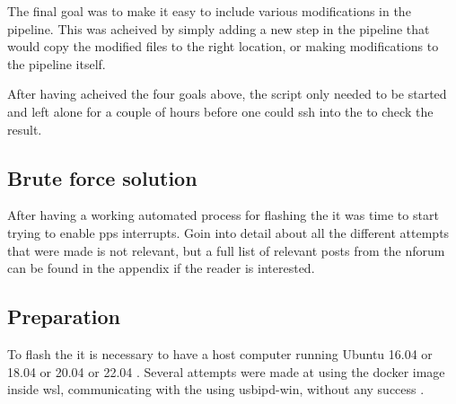 The final goal was to make it easy to include various modifications in the pipeline.
This was acheived by simply adding a new step in the pipeline that would copy the modified files to the right location, or making modifications to the pipeline itself.

After having acheived the four goals above, the script only needed to be started and left alone for a couple of hours before one could \gls{ssh} into the \jx to check the result.

\subsection{Brute force solution}
After having a working automated process for flashing the \jx it was time to start trying to enable \gls{pps} interrupts.
Goin into detail about all the different attempts that were made is not relevant, but a full list of relevant posts from the \gls{nforum} can be found in the appendix if the reader is interested.





\subsection{Preparation}
To flash the \jx it is necessary to have a host computer running Ubuntu 16.04 or 18.04 or 20.04 or 22.04 \cite{nvidiaSDKManager2019}.
Several attempts were made at using the docker image inside \gls{wsl}, communicating with the \jx using usbipd-win, without any success \cite{martensPortableSensorRig2022} \cite{nvidiaSDKManager2019} \cite{dorsselaerUsbipdwin2023}.


